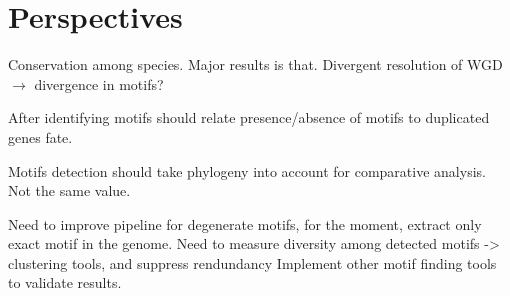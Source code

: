 \section*{Perspectives}

Conservation among species. Major results is that. Divergent resolution of WGD $\rightarrow$ divergence in motifs?

After identifying motifs should relate presence/absence of motifs to duplicated genes fate.

Motifs detection should take phylogeny into account for comparative analysis. Not the same value.

Need to improve pipeline for degenerate motifs, for the moment, extract only exact motif in the genome.
Need to measure diversity among detected motifs -> clustering tools, and suppress rendundancy
Implement other motif finding tools to validate results.
